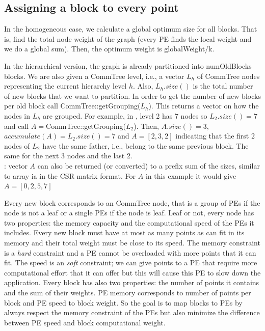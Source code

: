 \documentclass[a4paper,10pt]{article}
\newcommand{\red}[1]{{\color{red}{#1}}}
\newcommand{\blue}[1]{{\color{blue1}{#1}}}
\newcommand{\km}{$k$-means}
\newcommand{\todo}[1]{{\red{TODO}}: #1}
\begin{document}
\subsection*{Assigning a block to every point}
\blue{Note that most of this section is more related to the multi-constraint \km\ version and less to
the hierarchical version}

In the homogeneous case, we calculate a global optimum size for all blocks. That is, find the total
node weight of the graph (every PE finds the local weight and we do a global sum). Then, the
optimum weight is globalWeight/k.

In the hierarchical version, the graph is already partitioned into numOldBlocks blocks. 
We are also given a CommTree level, i.e., a vector $L_h$ of CommTree nodes representing the current
hierarchy level $h$. Also, $L_h.size()$ is the total number of new blocks that we want to partition.
In order to get the number of new blocks per old block call CommTree::getGrouping($L_h$).
This returns a vector on how the nodes in $L_h$ are grouped. For example, in , 
level 2 has 7 nodes so $L_2.size()=7$ and call $A=$CommTree::getGrouping($L_2$).
Then, $A.size()=3$, $accumulate(A)=L_2.size()=7$ and $A=[2,3,2]$ indicating that the first 2 
nodes of $L_2$ have the same
father, i.e., belong to the same previous block. The same for the next 3 nodes and the last 2.
\\\todo{vector $A$ can also be returned (or converted) to a prefix sum of the sizes, similar to
array ia in the CSR matrix format. For $A$ in this example it would give $A=[0,2,5,7]$}

Every new block corresponds to an CommTree node, that is a group of PEs if the node is not a leaf
or a single PEs if the node is leaf. Leaf or not, every node has two properties: the memory capacity
and the computational speed of the PEs  it includes. Every new block must have at most as many
points as can fit in its memory and their total weight must be close to its speed. The memory
constraint is a \emph{hard} constraint and a PE cannot be overloaded with more points that it can fit. 
The speed is an \emph{soft} constraint; we can give points to a PE that require more
computational effort that it can offer but this will cause this PE to slow down the application.
Every block has also two properties: the number of points it contains and the sum of their weights.
PE memory corresponds to number of points per block and PE speed to block weight.
So the goal is to map blocks to PEs by always respect the memory constraint of the PEs but also
minimize the difference between PE speed and block computational weight.
\end{document}
